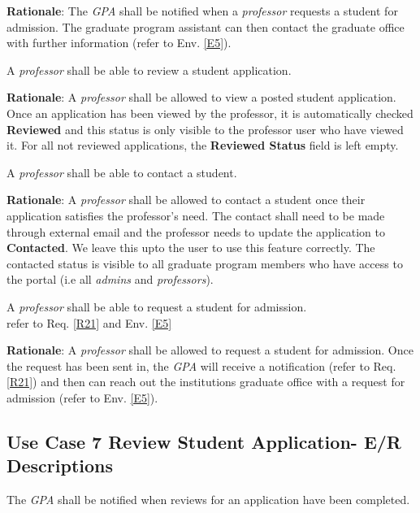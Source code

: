 \documentclass[fontsize=12pt,paper=letter,twoside]{scrartcl}
\begin{document}
\smallskip
\noindent \textbf{Rationale}: The \emph{GPA} shall be notified when a \emph{professor} requests a student for admission. The graduate program assistant can then contact the graduate office with further information (refer to Env. \ref{E5}).

\genreq
{A \emph{professor} shall be able to review a student application.\\}
{}
\label{R22}

\smallskip
\noindent \textbf{Rationale}: A \emph{professor} shall be allowed to view a posted student application. Once an application has been viewed by the professor, it is automatically checked \textbf{Reviewed} and this status is only visible to the professor user who have viewed it. For all not reviewed applications, the \textbf{Reviewed Status} field is left empty.

\genreq
{A \emph{professor} shall be able to contact a student.\\}
{}
\label{R23}

\smallskip
\noindent \textbf{Rationale}: A \emph{professor} shall be allowed to contact a student once their application satisfies the professor's need. The contact shall need to be made through external email and the professor needs to update the application to \textbf{Contacted}. We leave this upto the user to use this feature correctly. The contacted status is visible to all graduate program members who have access to the portal (i.e all \emph{admins} and \emph{professors}).

\rdescription
{A \emph{professor} shall be able to request a student for admission.\\}
{refer to Req. \ref{R21} and Env. \ref{E5}}
\label{R24}

\smallskip
\noindent \textbf{Rationale}: A \emph{professor} shall be allowed to request a student for admission. Once the request has been sent in, the \emph{GPA} will receive a notification (refer to Req. \ref{R21}) and then can reach out the institutions graduate office with a request for admission (refer to Env. \ref{E5}).

\subsection{Use Case 7 Review Student Application- E/R Descriptions}

\genreq
{The \emph{GPA} shall be notified when reviews for an application have been completed.\\}
{}
\label{R25}
\end{document}
